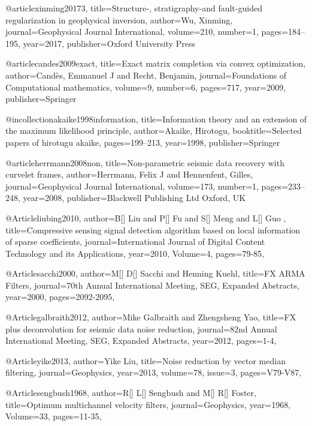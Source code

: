 @article{xinming20173,
  title={Structure-, stratigraphy-and fault-guided regularization in geophysical inversion},
  author={Wu, Xinming},
  journal={Geophysical Journal International},
  volume={210},
  number={1},
  pages={184--195},
  year={2017},
  publisher={Oxford University Press}
}

@article{candes2009exact,
  title={Exact matrix completion via convex optimization},
  author={Cand{\`e}s, Emmanuel J and Recht, Benjamin},
  journal={Foundations of Computational mathematics},
  volume={9},
  number={6},
  pages={717},
  year={2009},
  publisher={Springer}
}

@incollection{akaike1998information,
  title={Information theory and an extension of the maximum likelihood principle},
  author={Akaike, Hirotogu},
  booktitle={Selected papers of hirotugu akaike},
  pages={199--213},
  year={1998},
  publisher={Springer}
}

@article{herrmann2008non,
  title={Non-parametric seismic data recovery with curvelet frames},
  author={Herrmann, Felix J and Hennenfent, Gilles},
  journal={Geophysical Journal International},
  volume={173},
  number={1},
  pages={233--248},
  year={2008},
  publisher={Blackwell Publishing Ltd Oxford, UK}
}

@Article{liubing2010,
  author={B[] Liu and P[] Fu and S[] Meng and L[] Guo },
  title={Compressive sensing signal detection algorithm based on local information of sparse coefficients},
  journal={International Journal of Digital Content Technology and its Applications},
  year=2010,
  Volume=4,
  pages={79-85},
}


@Article{sacchi2000,
  author={M[] D[] Sacchi and Henning Kuehl},
  title={FX ARMA Filters},
  journal={70th Annual International Meeting, SEG, Expanded Abstracts},
  year=2000,
  pages={2092-2095},
}

@Article{galbraith2012,
  author={Mike Galbraith and Zhengsheng Yao},
  title={FX plus deconvolution for seismic data noise reduction},
  journal={82nd Annual International Meeting, SEG, Expanded Abstracts},
  year=2012,
  pages={1-4},
}

@Article{yike2013,
  author={Yike Liu},
  title={Noise reduction by vector median filtering},
  journal={Geophysics},
  year=2013,
  volume=78,
  issue=3,
  pages={V79-V87},
}



@Article{sengbush1968,
  author={R[] L[] Sengbush and M[] R[] Foster},
  title={Optimum multichannel velocity filters},
  journal={Geophysics},
  year=1968,
  Volume=33,
  pages={11-35},
}

